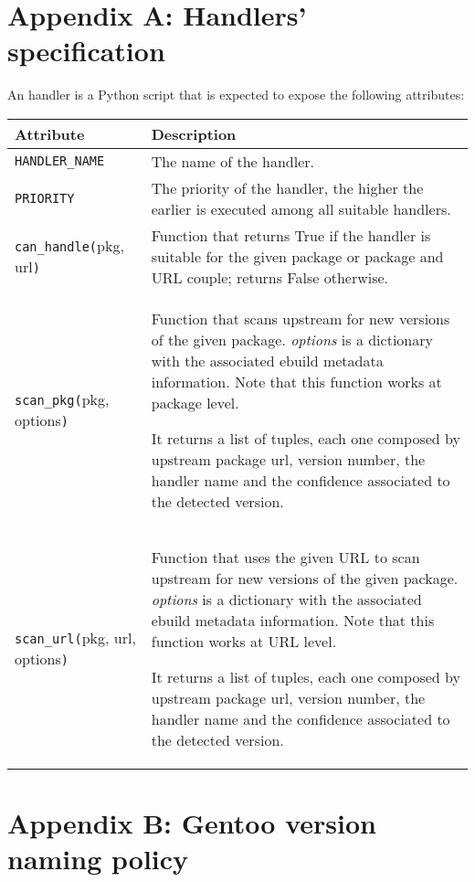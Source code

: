 
\section*{Appendix A: Handlers' specification}
\label{sec:handlers_appendix}
An handler is a Python script that is expected to expose the following attributes:

\bgroup
\def\arraystretch{1.2}
\begin{table}[ht]
\centering
\begin{tabular}{l p{8cm}}
\hline\hline
Attribute & Description \\
\hline

\texttt{HANDLER\_NAME} & The name of the handler. \\
\hline

\texttt{PRIORITY} & The priority of the handler, the higher the earlier is executed among all suitable handlers. \\
\hline

\texttt{can\_handle(}pkg, url\texttt{)} &  Function that returns True if the handler is suitable for the given package or package and URL couple; returns False otherwise. \\
\hline

\texttt{scan\_pkg(}pkg, options\texttt{)} & Function that scans upstream for new versions of the given package. \emph{options} is a dictionary with the associated ebuild metadata information. Note that this function works at package level.

It returns a list of tuples, each one composed by upstream package url, version number, the handler name and the confidence associated to the detected version. \\
\hline

\texttt{scan\_url(}pkg, url, options\texttt{)} & Function that uses the given URL to scan upstream for new versions of the given package. \emph{options} is a dictionary with the associated ebuild metadata information. Note that this function works at URL level.

It returns a list of tuples, each one composed by upstream package url, version number, the handler name and the confidence associated to the detected version. \\
\hline

\end{tabular}
\end{table}
\egroup


\section*{Appendix B: Gentoo version naming policy}
\label{sec:version_appendix}

